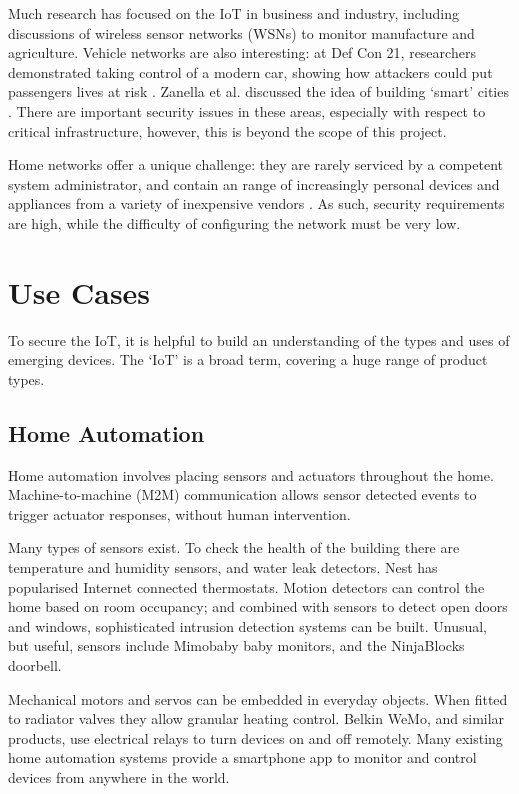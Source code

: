 \documentclass[10pt,journal,compsoc]{IEEEtran}
\begin{document}
Much research has focused on the IoT in business and industry, including
discussions of wireless sensor networks (WSNs) to monitor manufacture and
agriculture. Vehicle networks are also interesting: at Def Con 21, researchers
demonstrated taking control of a modern car, showing how attackers could put
passengers lives at risk \cite{Illera2014}. Zanella et al. discussed the idea
of building `smart' cities \cite{Zanella2014}. There are important security
issues in these areas, especially with respect to critical infrastructure,
however, this is beyond the scope of this project.  

Home networks offer a unique challenge: they are rarely serviced by a competent
system administrator, and contain an range of increasingly personal devices and
appliances from a variety of inexpensive vendors \cite{Denning2013}. As such,
security requirements are high, while the difficulty of configuring the network
must be very low. 

\section{Use Cases}
To secure the IoT, it is helpful to build an understanding of the types and
uses of emerging devices. The `IoT' is a broad term, covering a huge range of
product types.

\subsection{Home Automation}
Home automation involves placing sensors and actuators throughout the home.
Machine-to-machine (M2M) communication allows sensor detected events to trigger
actuator responses, without human intervention. 

Many types of sensors exist. To check the health of the building there are
temperature and humidity sensors, and water leak detectors. Nest has
popularised Internet connected thermostats. Motion detectors can control the
home based on room occupancy; and combined with sensors to detect open doors
and windows, sophisticated intrusion detection systems can be built. Unusual,
but useful, sensors include Mimobaby baby monitors, and the NinjaBlocks
doorbell.

Mechanical motors and servos can be embedded in everyday objects. When fitted
to radiator valves they allow granular heating control. Belkin WeMo, and
similar products, use electrical relays to turn devices on and off remotely.
Many existing home automation systems provide a smartphone app to monitor and
control devices from anywhere in the world. 
\end{document}
